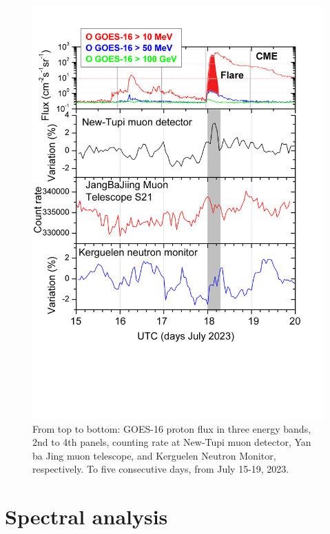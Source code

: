 \documentclass[twocolumn]{aastex63}
\begin{document}
\begin{figure}[]
\vspace*{-0.5cm}
\hspace*{-0.0cm}
\centering
\includegraphics[clip,width=0.5
\textwidth,height=0.4\textheight,angle=0.] {Fig5.png}
\vspace*{-1.5cm}
\caption{From top to bottom: GOES-16 proton flux in three energy bands, 2nd to 4th panels, counting rate at New-Tupi muon detector, Yan ba Jing muon telescope, and Kerguelen Neutron Monitor, respectively.
To five consecutive days, from July 15-19, 2023.
}
\label{quatro}
\end{figure} 



\section{Spectral analysis}
\end{document}
